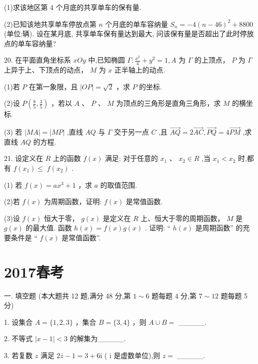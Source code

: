 \documentclass[10pt]{article}
\begin{document}
(1)求该地区第 4 个月底的共享单车的保有量.

(2)已知该地共享单车停放点第 \(n\) 个月底的单车容纳量 \({S}_{n} =  - 4{\left( n - {46}\right) }^{2} + {8800}\) (单位:辆). 设在某月底, 共享单车保有量达到最大, 问该保有量是否超出了此时停放点的单车容纳量?

20. 在平面直角坐标系 \({xOy}\) 中,已知椭圆 \(\Gamma  : \frac{{x}^{2}}{4} + {y}^{2} = 1,A\) 为 \(\Gamma\) 的上顶点， \(P\) 为 \(\Gamma\) 上异于上、下顶点的动点， \(M\) 为 \(x\) 正半轴上的动点.

(1)若 \(P\) 在第一象限，且 \(\left| {OP}\right|  = \sqrt{2}\) ，求 \(P\) 的坐标.

(2)设 \(P\left( {\frac{8}{5},\frac{3}{5}}\right)\) ，若以 \(A\) 、 \(P\) 、 \(M\) 为顶点的三角形是直角三角形，求 \(M\) 的横坐标.

(3) 若 \(\left| {MA}\right|  = \left| {MP}\right|\) ,直线 \({AQ}\) 与 \(\Gamma\) 交于另一点 \(C\) ,且 \(\overrightarrow{AQ} = 2\overrightarrow{AC},\overrightarrow{PQ} = 4\overrightarrow{PM}\) ,求直线 \({AQ}\) 的方程.

21. 设定义在 \(R\) 上的函数 \(f\left( x\right)\) 满足: 对于任意的 \({x}_{1}\text{ 、 }{x}_{2} \in  R\) ,当 \({x}_{1} < {x}_{2}\) 时,都有 \(f\left( {x}_{1}\right)  \leq \; f\left( {x}_{2}\right)\) .

(1) 若 \(f\left( x\right)  = a{x}^{3} + 1\) ，求 \(a\) 的取值范围.

(2)若 \(f\left( x\right)\) 为周期函数，证明: \(f\left( x\right)\) 是常值函数.

(3)设 \(f\left( x\right)\) 恒大于零， \(g\left( x\right)\) 是定义在 \(R\) 上、恒大于零的周期函数， \(M\) 是 \(g\left( x\right)\) 的最大值. 函数 \(h\left( x\right)  = f\left( x\right) g\left( x\right)\) . 证明: “ \(h\left( x\right)\) 是周期函数” 的充要条件是 “ \(f\left( x\right)\) 是常值函数”.

\section*{2017春考}

一. 填空题 (本大题共 12 题,满分 48 分,第 \(1 \sim  6\) 题每题 4 分,第 \(7 \sim  {12}\) 题每题 5 分)

1. 设集合 \(A = \{ 1,2,3\}\) ，集合 \(B = \{ 3,4\}\) ，则 \(A \cup  B =\) \_\_\_\_\_.

2. 不等式 \(\left| {x - 1}\right|  < 3\) 的解集为\_\_\_\_\_.

3. 若复数 \(z\) 满足 \(2\bar{z} - 1 = 3 + 6\mathrm{i}\) ( \(\mathrm{i}\) 是虚数单位),则 \(z =\) \_\_\_\_\_.
\end{document}
